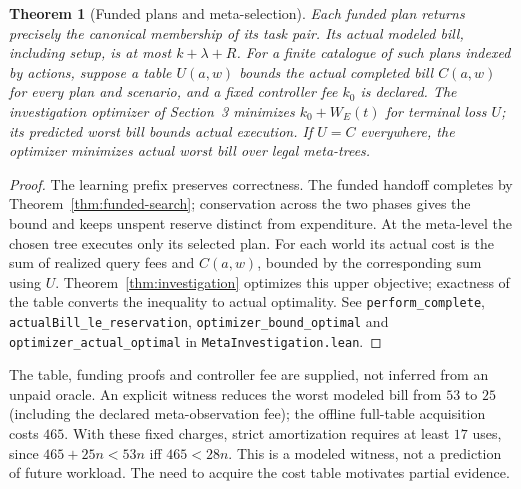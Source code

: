 \documentclass[10pt,letterpaper]{article}
\newtheorem{theorem}{Theorem}[section]
\newcommand{\rc}[1]{\texttt{#1}}
\begin{document}
\begin{theorem}[Funded plans and meta-selection]\label{thm:meta-selection}
Each funded plan returns precisely the canonical membership of its task pair. Its actual modeled bill, including setup, is at most $k+\lambda+R$. For a finite catalogue of such plans indexed by actions, suppose a table $U(a,w)$ bounds the actual completed bill $C(a,w)$ for every plan and scenario, and a fixed controller fee $k_0$ is declared. The investigation optimizer of Section~3 minimizes $k_0+W_E(t)$ for terminal loss $U$; its predicted worst bill bounds actual execution. If $U=C$ everywhere, the optimizer minimizes actual worst bill over legal meta-trees.
\end{theorem}
\begin{proof}
The learning prefix preserves correctness. The funded handoff completes by Theorem~\ref{thm:funded-search}; conservation across the two phases gives the bound and keeps unspent reserve distinct from expenditure. At the meta-level the chosen tree executes only its selected plan. For each world its actual cost is the sum of realized query fees and $C(a,w)$, bounded by the corresponding sum using $U$. Theorem~\ref{thm:investigation} optimizes this upper objective; exactness of the table converts the inequality to actual optimality. See \rc{perform\_complete}, \rc{actualBill\_le\_reservation}, \rc{optimizer\_bound\_optimal} and \rc{optimizer\_actual\_optimal} in \rc{MetaInvestigation.lean}.
\end{proof}
The table, funding proofs and controller fee are supplied, not inferred from an unpaid oracle. An explicit witness reduces the worst modeled bill from $53$ to $25$ (including the declared meta-observation fee); the offline full-table acquisition costs $465$. With these fixed charges, strict amortization requires at least $17$ uses, since $465+25n<53n$ iff $465<28n$. This is a modeled witness, not a prediction of future workload. The need to acquire the cost table motivates partial evidence.
\end{document}
